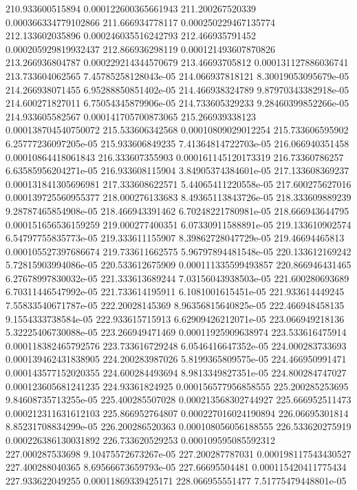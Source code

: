 {210.933600515894 0.000122600365661943
211.200267520339 0.000366334779102866
211.666934778117 0.000250229467135774
212.133602035896 0.000246035516242793
212.466935791452 0.000205929819932437
212.866936298119 0.000121493607870826
213.266936804787 0.000229214344570679
213.46693705812 0.000131127886036741
213.733604062565 7.45785258128043e-05
214.066937818121 8.30019053095679e-05
214.266938071455 6.95288850851402e-05
214.466938324789 9.87970343382918e-05
214.600271827011 6.75054345879906e-05
214.733605329233 9.28460399852266e-05
214.933605582567 0.000141705700873065
215.266939338123 0.000138704540750072
215.533606342568 0.00010809029012254
215.733606595902 6.25777236097205e-05
215.933606849235 7.41364814722703e-05
216.066940351458 0.00010864418061843
216.333607355903 0.000161145120173319
216.73360786257 6.63585956204271e-05
216.933608115904 3.84905374384601e-05
217.133608369237 0.000131841305696981
217.333608622571 5.44065411220558e-05
217.600275627016 0.000139725560955377
218.000276133683 8.49365113843726e-05
218.333609889239 9.28787465854908e-05
218.466943391462 6.70248221780981e-05
218.666943644795 0.000151656536159259
219.000277400351 6.07330911588891e-05
219.133610902574 6.54797755835773e-05
219.333611155907 8.39862728047729e-05
219.46694465813 0.000105527397686674
219.733611662575 5.96797894481548e-05
220.133612169242 5.72815903994086e-05
220.533612675909 0.000111335599493857
220.866946431465 6.27678997830032e-05
221.333613689244 7.03156043938503e-05
221.600280693689 6.70311446547992e-05
221.733614195911 6.1081001615451e-05
221.933614449245 7.55833540671787e-05
222.20028145369 8.96356815640825e-05
222.466948458135 9.1554333738584e-05
222.933615715913 6.62909426212071e-05
223.066949218136 5.32225406730088e-05
223.266949471469 0.00011925909638974
223.533616475914 0.000118382465792576
223.733616729248 6.0546416647352e-05
224.000283733693 0.000139462431838905
224.200283987026 5.8199365809575e-05
224.466950991471 0.000143577152020355
224.600284493694 8.9813349827351e-05
224.800284747027 0.000123605681241235
224.93361824925 0.000156577956858555
225.200285253695 9.84608735713255e-05
225.400285507028 0.000213568302744927
225.666952511473 0.000212311631612103
225.866952764807 0.000227016024190894
226.06695301814 8.85231708834299e-05
226.200286520363 0.000108056056188555
226.533620275919 0.000226386130031892
226.733620529253 0.000109595085592312
227.000287533698 9.10475572673267e-05
227.200287787031 0.000198117543430527
227.400288040365 8.69566673659793e-05
227.66695504481 0.000115420411775434
227.933622049255 0.00011869339425171
228.066955551477 7.51775479448801e-05
}
